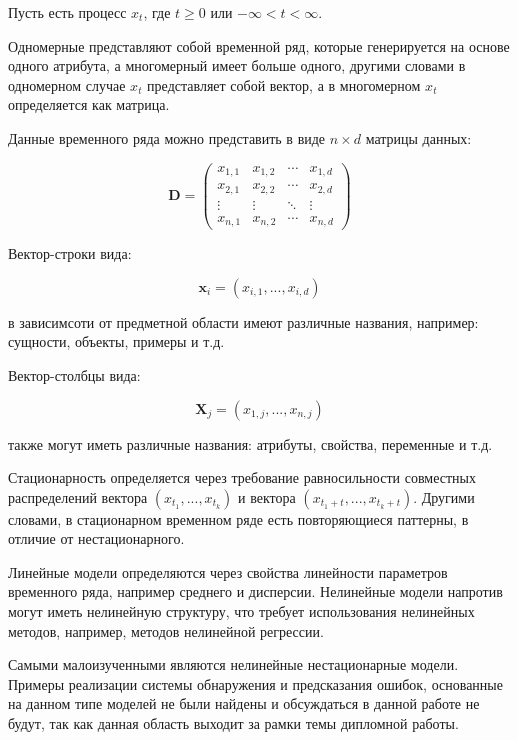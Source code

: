 Пусть есть процесс $x_t$, где $t \geq 0$ или $-\infty < t < \infty $.

Одномерные представляют собой временной ряд, которые генерируется на основе одного атрибута,
а многомерный имеет больше одного, другими словами в одномерном случае $x_t$ представляет собой вектор,
а в многомерном $x_t$ определяется как матрица.

Данные временного ряда можно представить в виде $n\times d$ матрицы данных: \cite{zaki}

\begin{equation} \label{data_matrix}
    \textbf{D} = 
    \begin{pmatrix}
    x_{1,1} & x_{1,2} & \cdots & x_{1,d} \\
    x_{2,1} & x_{2,2} & \cdots & x_{2,d} \\
    \vdots  & \vdots  & \ddots & \vdots  \\
    x_{n,1} & x_{n,2} & \cdots & x_{n,d} 
    \end{pmatrix}
\end{equation}

Вектор-строки вида:

\begin{equation}
    \textbf{x}_i = (x_{i,1}, ..., x_{i,d})
\end{equation}

в зависимсоти от предметной области имеют различные названия, например:
сущности, объекты, примеры и т.д.

Вектор-столбцы вида:

\begin{equation}
    \textbf{X}_j = (x_{1,j}, ..., x_{n,j})
\end{equation}

также могут иметь различные названия: атрибуты, свойства, переменные и т.д.

Стационарность определяется через требование равносильности совместных распределений вектора
$(x_{t_1}, ..., x_{t_k})$ и вектора $(x_{t_1+t}, ..., x_{t_k+t})$.
Другими словами, в стационарном временном ряде есть повторяющиеся паттерны,
в отличие от нестационарного. \cite{terence-series}

Линейные модели определяются через свойства линейности параметров временного ряда, например среднего и дисперсии.
Нелинейные модели напротив могут иметь нелинейную структуру, что требует использования
нелинейных методов, например, методов нелинейной регрессии. \cite{douglas-series}

Самыми малоизученными являются нелинейные нестационарные модели. \cite{rao-series}
Примеры реализации системы обнаружения и предсказания ошибок,
основанные на данном типе моделей не были найдены и обсуждаться в данной работе не будут,
так как данная область выходит за рамки темы дипломной работы.

